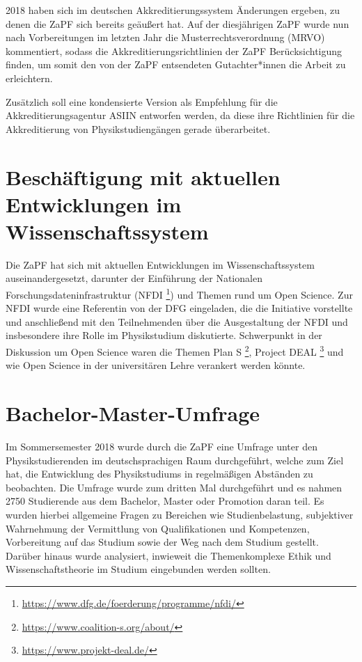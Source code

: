 2018 haben sich im deutschen Akkreditierungssystem Änderungen ergeben, zu denen die ZaPF sich bereits geäußert hat. 
Auf der diesjährigen ZaPF wurde nun nach Vorbereitungen im letzten Jahr die Musterrechtsverordnung (MRVO) kommentiert, 
sodass die Akkreditierungsrichtlinien der ZaPF Berücksichtigung finden, um somit den von der ZaPF entsendeten Gutachter*innen die Arbeit zu erleichtern.

Zusätzlich soll eine kondensierte Version als Empfehlung für die Akkreditierungsagentur ASIIN entworfen werden, da diese ihre Richtlinien für die Akkreditierung von Physikstudiengängen gerade überarbeitet. 

\section*{Beschäftigung mit aktuellen Entwicklungen im Wissenschaftssystem}

Die ZaPF hat sich mit aktuellen Entwicklungen im Wissenschaftssystem auseinandergesetzt, darunter der Einführung der Nationalen Forschungsdateninfrastruktur (NFDI \footnote{\url{https://www.dfg.de/foerderung/programme/nfdi/}}) und Themen rund um Open Science. 
Zur NFDI wurde eine Referentin von der DFG eingeladen, die die Initiative vorstellte und anschließend mit den Teilnehmenden über die Ausgestaltung der NFDI und insbesondere ihre Rolle im Physikstudium diskutierte.
Schwerpunkt in der Diskussion um Open Science waren die Themen Plan S \footnote{\url{https://www.coalition-s.org/about/}}, Project DEAL \footnote{\url{https://www.projekt-deal.de/}} und wie Open Science in der universitären Lehre verankert werden könnte.

\section*{Bachelor-Master-Umfrage}

Im Sommersemester 2018 wurde durch die ZaPF eine Umfrage unter den Physikstudierenden im deutschsprachigen Raum durchgeführt, welche zum Ziel hat, die Entwicklung des Physikstudiums in regelmäßigen Abständen zu beobachten. 
Die Umfrage wurde zum dritten Mal durchgeführt und es nahmen 2750 Studierende aus dem Bachelor, Master oder Promotion daran teil. 
Es wurden hierbei allgemeine Fragen zu Bereichen wie Studienbelastung, subjektiver Wahrnehmung der Vermittlung von Qualifikationen und Kompetenzen, Vorbereitung auf das Studium sowie der Weg nach dem Studium gestellt. 
Darüber hinaus wurde analysiert, inwieweit die Themenkomplexe Ethik und Wissenschaftstheorie im Studium eingebunden werden sollten.

